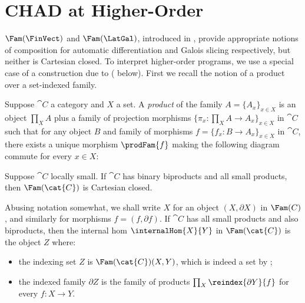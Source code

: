 \section{CHAD at Higher-Order}
\label{sec:higher-order}

$\Fam(\FinVect)$ and $\Fam(\LatGal)$, introduced in , provide appropriate notions of
composition for automatic differentiation and Galois slicing respectively, but neither is Cartesian closed. To
interpret higher-order programs, we use a special case of a construction due to \citet{nunes2023}
( below). First we recall the notion of a product over a set-indexed family.

\begin{definition}
Suppose $\cat{C}$ a category and $X$ a set. A \emph{product} of the family $A = \{A_x\}_{x \in X}$ is an
object $\prod_{X}A$ plus a family of projection morphisms $\{\pi_x: \prod_{X} A \to A_x\}_{x \in X}$ in
$\cat{C}$ such that for any object $B$ and family of morphisms $f = \{f_x: B \to A_x\}_{x \in X}$ in
$\cat{C}$, there exists a unique morphism $\prodFam{f}$ making the following diagram commute for every $x \in
X$:

\begin{center}
\end{center}
\end{definition}

\begin{proposition}
\label{prop:higher-order:fam-CC}
Suppose $\cat{C}$ locally small. If $\cat{C}$ has binary biproducts and all small products, then
$\Fam(\cat{C})$ is Cartesian closed.
\end{proposition}

Abusing notation somewhat, we shall write $X$ for an object $(X, \partial X)$ in $\Fam(C)$, and similarly for
morphisms $f = (f, \partial f)$. If $\cat{C}$ has all small products and also biproducts, then the internal
hom $\internalHom{X}{Y}$ in $\Fam(\cat{C})$ is the object $Z$ where:
\begin{itemize}
\item the indexing set $Z$ is $\Fam(\cat{C})(X, Y)$, which is indeed a set by
;
\item the indexed family $\partial Z$ is the family of products $\prod_{X}\reindex{\partial Y}{f}$ for every
${f: X \to Y}$.
\end{itemize}

